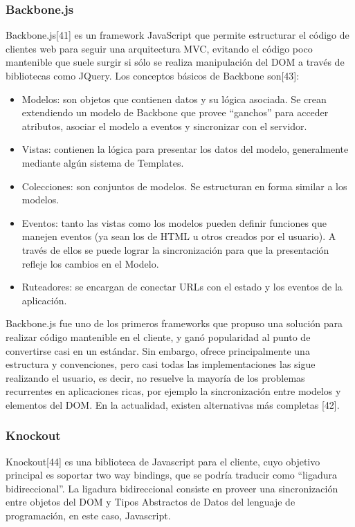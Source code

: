 \documentclass[doc,helv,longtable]{article}
\begin{document}
\subsubsection{Backbone.js}


Backbone.js[41] es un framework JavaScript que permite estructurar el código de clientes web para seguir una arquitectura MVC, evitando el código poco mantenible que suele surgir si sólo se realiza manipulación del DOM a través de bibliotecas como JQuery. Los conceptos básicos de Backbone son[43]:
\begin{itemize}
\item  Modelos: son objetos que contienen datos y su lógica asociada. Se crean extendiendo un modelo de Backbone que provee “ganchos” para acceder atributos, asociar el modelo a eventos y sincronizar con el servidor.
\item  Vistas: contienen la lógica para presentar los datos del modelo, generalmente mediante algún sistema de Templates.
\item  Colecciones: son conjuntos de modelos. Se estructuran en forma similar a los modelos.
\item  Eventos: tanto las vistas como los modelos pueden definir funciones que manejen eventos (ya sean los de HTML u otros creados por el usuario). A través de ellos se puede lograr la sincronización para que la presentación refleje los cambios en el Modelo.
\item  Ruteadores: se encargan de conectar URLs con el estado y los eventos de la aplicación.

\end{itemize}


Backbone.js fue uno de los primeros frameworks que propuso una solución para realizar código mantenible en el cliente, y ganó popularidad al punto de convertirse casi en un estándar. Sin embargo, ofrece principalmente una estructura y convenciones, pero casi todas las implementaciones las sigue realizando el usuario, es decir, no resuelve la mayoría de los problemas recurrentes en aplicaciones ricas, por ejemplo la sincronización entre modelos y elementos del DOM. En la actualidad, existen alternativas más completas [42].\subsubsection{Knockout}


Knockout[44] es una biblioteca de Javascript para el cliente, cuyo objetivo principal es soportar two way bindings, que se podría traducir como “ligadura bidireccional”. La ligadura bidireccional consiste en proveer una sincronización entre objetos del DOM y Tipos Abstractos de Datos del lenguaje de programación, en este caso, Javascript. 
\end{document}
